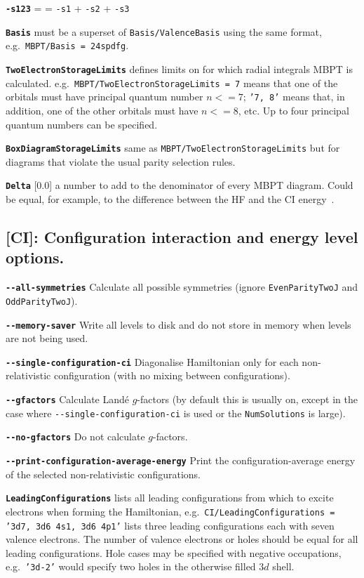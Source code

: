 \documentclass[a4paper,11pt]{article}
\newcommand{\option}[1]{\smallskip\noindent\textbf{\texttt{#1}}}
\newcommand{\code}[1]{\texttt{#1}}
\begin{document}
\option{-s123} = = \texttt{-s1} + \texttt{-s2} + \texttt{-s3}

\option{Basis} must be a superset of \texttt{Basis/ValenceBasis} using the same format, e.g.~\texttt{MBPT/Basis = 24spdfg}.

\option{TwoElectronStorageLimits} defines limits on for which radial integrals MBPT is calculated. e.g.~\texttt{MBPT/TwoElectronStorageLimits = 7} means that one of the orbitals must have principal quantum number $n <= 7$; \texttt{'7, 8'} means that, in addition, one of the other orbitals must have $n <= 8$, etc. Up to four principal quantum numbers can be specified.

\option{BoxDiagramStorageLimits} same as \texttt{MBPT/TwoElectronStorageLimits} but for diagrams that violate the usual parity selection rules.

\option{Delta} [0.0] a number to add to the denominator of every MBPT diagram. Could be equal, for example, to the difference between the HF and the CI energy~\cite{kozlov99os,berengut08jpb}.

\subsection{[CI]: Configuration interaction and energy level options.}

\option{-{}-all-symmetries} Calculate all possible symmetries (ignore \code{EvenParityTwoJ} and \code{OddParityTwoJ}).

\option{-{}-memory-saver} Write all levels to disk and do not store in memory when levels are not being used.

\option{-{}-single-configuration-ci} Diagonalise Hamiltonian only for each non-relativistic configuration (with no mixing between configurations).

\option{-{}-gfactors} Calculate Land\'e $g$-factors (by default this is usually on, except in the case where  \code{-{}-single-configuration-ci} is used or the \code{NumSolutions} is large).

\option{-{}-no-gfactors} Do not calculate $g$-factors.

\option{-{}-print-configuration-average-energy} Print the configuration-average energy of the selected non-relativistic configurations.

\option{LeadingConfigurations} lists all leading configurations from which to excite electrons when forming the Hamiltonian, e.g.~\texttt{CI/LeadingConfigurations = '3d7, 3d6 4s1, 3d6 4p1'} lists three leading configurations each with seven valence electrons. The number of valence electrons or holes should be equal for all leading configurations. Hole cases may be specified with negative occupations, e.g.~\code{'3d-2'} would specify two holes in the otherwise filled $3d$ shell.
\end{document}
